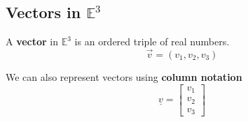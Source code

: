 \subsection{Vectors in $\mathbb{E}^3$}
\begin{definition}
  A \textbf{vector} in $\mathbb{E}^3$ is an ordered triple of real numbers.\\
  \vspace{-10px}
  \begin{equation}
    \vec{v} = (v_1,v_2,v_3)
  \end{equation}
\end{definition}

\begin{Notation}
  We can also represent vectors using {\bf column notation}
  $$\underline{v} = \begin{bmatrix} v_1 \\ v_2 \\ v_3\end{bmatrix} $$
  
\end{Notation}

